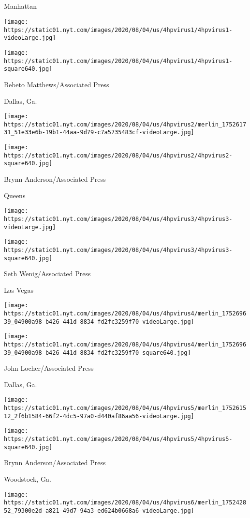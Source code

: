 \subsection{}

\href{https://www.nytimes.com/2020/08/04/world/coronavirus-covid-19.html}{}

Manhattan

\texttt{[image: https://static01.nyt.com/images/2020/08/04/us/4hpvirus1/4hpvirus1-videoLarge.jpg]}

\texttt{[image: https://static01.nyt.com/images/2020/08/04/us/4hpvirus1/4hpvirus1-square640.jpg]}

 Bebeto Matthews/Associated Press

Dallas, Ga.

\texttt{[image: https://static01.nyt.com/images/2020/08/04/us/4hpvirus2/merlin\_175261731\_51e33e6b-19b1-44aa-9d79-c7a5735483cf-videoLarge.jpg]}

\texttt{[image: https://static01.nyt.com/images/2020/08/04/us/4hpvirus2/4hpvirus2-square640.jpg]}

 Brynn Anderson/Associated Press

Queens

\texttt{[image: https://static01.nyt.com/images/2020/08/04/us/4hpvirus3/4hpvirus3-videoLarge.jpg]}

\texttt{[image: https://static01.nyt.com/images/2020/08/04/us/4hpvirus3/4hpvirus3-square640.jpg]}

 Seth Wenig/Associated Press

Las Vegas

\texttt{[image: https://static01.nyt.com/images/2020/08/04/us/4hpvirus4/merlin\_175269639\_04900a98-b426-441d-8834-fd2fc3259f70-videoLarge.jpg]}

\texttt{[image: https://static01.nyt.com/images/2020/08/04/us/4hpvirus4/merlin\_175269639\_04900a98-b426-441d-8834-fd2fc3259f70-square640.jpg]}

 John Locher/Associated Press

Dallas, Ga.

\texttt{[image: https://static01.nyt.com/images/2020/08/04/us/4hpvirus5/merlin\_175261512\_2f6b1584-66f2-4dc5-97a0-d440af86aa56-videoLarge.jpg]}

\texttt{[image: https://static01.nyt.com/images/2020/08/04/us/4hpvirus5/4hpvirus5-square640.jpg]}

 Brynn Anderson/Associated Press

Woodstock, Ga.

\texttt{[image: https://static01.nyt.com/images/2020/08/04/us/4hpvirus6/merlin\_175242852\_79300e2d-a821-49d7-94a3-ed624b0668a6-videoLarge.jpg]}

